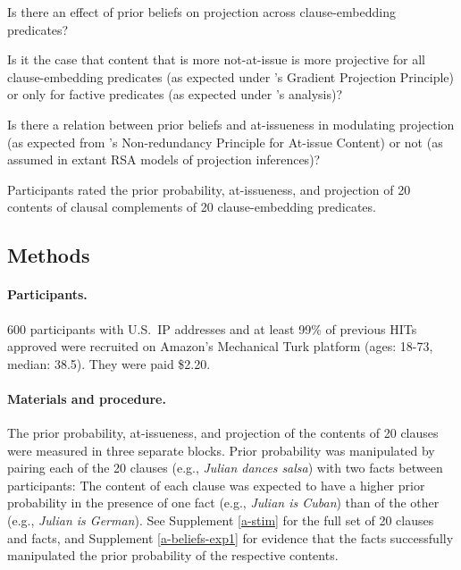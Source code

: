 \documentclass[11pt,fleqn]{article}
\newcommand{\6}{\mbox{$[\hspace*{-.6mm}[$}}
\newcommand{\9}{\mbox{$]\hspace*{-.6mm}]$}}
\newcommand{\citepos}[1]{\citeauthor{#1}'s \citeyear{#1}}
\begin{document}
\begin{exe}
\ex
\begin{xlist}
 Is there an effect of prior beliefs on projection across clause-embedding predicates? 

 Is it the case that content that is more not-at-issue is more projective for all clause-embedding predicates (as expected under \citepos{tbd-variability} Gradient Projection Principle) or only for factive predicates (as expected under \citepos{djaerv-bacovcin2020} analysis)? 

 Is there a relation between prior beliefs and at-issueness in modulating projection (as expected from \citepos{tonhauser-etal-eval} Non-redundancy Principle for At-issue Content) or not (as assumed in extant RSA models of projection inferences)? 
\end{xlist}
\end{exe}
Participants rated the prior probability, at-issueness, and projection of 20 contents of clausal complements of 20 clause-embedding predicates. 

\subsection{Methods} 
 
\paragraph{Participants.} 600 participants with U.S.\ IP addresses and at least 99\% of previous HITs approved were recruited on Amazon's Mechanical Turk platform (ages: 18-73, median: 38.5). They were paid \$2.20.

\paragraph{Materials and procedure.} The prior probability, at-issueness, and projection of the contents of 20 clauses were measured in three separate blocks. Prior probability was manipulated by pairing each of the 20 clauses (e.g., \emph{Julian dances salsa})  with two facts between participants: The content of each clause was expected to have a higher prior probability in the presence of one fact (e.g., \emph{Julian is Cuban}) than of the other (e.g., \emph{Julian is German}). See Supplement \ref{a-stim} for the full set of 20 clauses and facts, and Supplement \ref{a-beliefs-exp1} for evidence that the facts successfully manipulated the prior probability of the respective contents.
\end{document}
